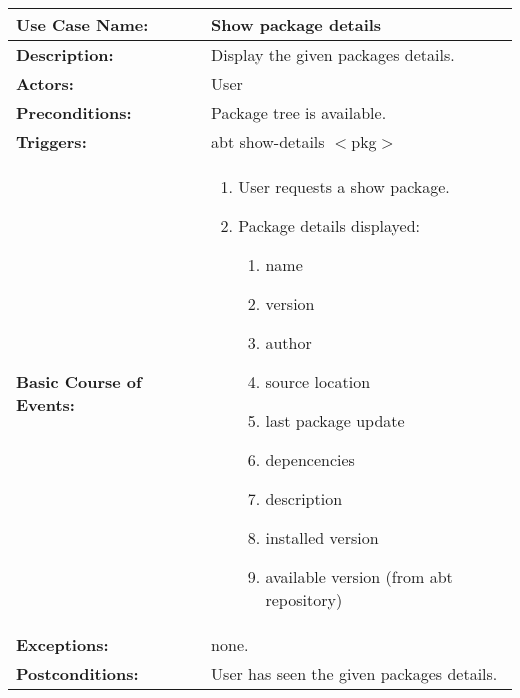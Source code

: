 
\begin{tabularx}{\linewidth}{|l|X|}
\hline
\textbf{Use Case Name:} & \textbf{Show package details} \\
\hline
\textbf{Description:} & Display the given packages details. \\
\hline
\textbf{Actors:} & User \\
\hline
\textbf{Preconditions:} & Package tree is available. \\
\hline
\textbf{Triggers:} & abt show-details $<$pkg$>$ \\
\hline
\textbf{Basic Course of Events:} & 
\begin{minipage}{\linewidth} 
  \vspace{0.05em}
  \begin{enumerate}
    \item User requests a show package.
    \item Package details displayed:
      \begin{enumerate}
        \item name
        \item version
        \item author
        \item source location
        \item last package update
        \item depencencies
        \item description
        \item installed version
        \item available version (from abt repository)
      \end{enumerate}
  \end{enumerate}
  \vspace{0.05em}
\end{minipage}
\\
\hline 
\textbf{Exceptions:} & none. \\
\hline 
\textbf{Postconditions:} &
User has seen the given packages details. \\
\hline
\end{tabularx}


